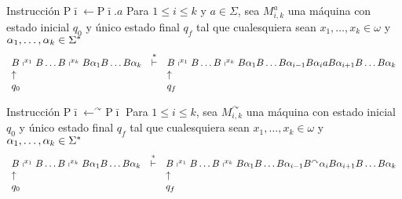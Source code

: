 \begin{frame}
	\begin{block}{Instrucción $\mathrm{P}\bar{\imath} \leftarrow \mathrm{P}\bar{\imath}.a$}
		\PN Para $1 \leq i \leq k$ y $a \in \Sigma $, sea $M_{i,k}^{a}$ una máquina con estado inicial $q_{0}$ y único
		estado final $q_{f}$ tal que cualesquiera sean $x_{1}, \dotsc, x_{k} \in \omega$ y $\alpha_{1}, \dotsc, \alpha_{k}
		\in \Sigma^{\ast}$
		\minLetter
		\[
			\begin{array}{lcl}
				B \shortmid^{x_{1}} B \dotsc B \shortmid^{x_{k}} B \alpha_{1} B \dotsc B \alpha_{k} &\overset{\ast}{\vdash}& B
					\shortmid^{x_{1}} B \dotsc B \shortmid^{x_{k}} B \alpha_{1} B \dotsc B \alpha_{i-1} B \alpha_{i} a B
					\alpha_{i+1} B \dotsc B \alpha_{k} \\
				\uparrow && \uparrow \\
				q_{0} && q_{f}
			\end{array}
		\]
	\end{block}

  \begin{block}{Instrucción $\mathrm{P}\bar{\imath} \leftarrow ^{\curvearrowright}\mathrm{P}\bar{\imath}$}
		\PN Para $1 \leq i \leq k$, sea $M_{i,k}^{\curvearrowright}$ una máquina con estado inicial $q_{0}$ y único estado
		final $q_{f}$ tal que cualesquiera sean $x_{1}, \dotsc, x_{k} \in \omega$ y $\alpha_{1}, \dotsc, \alpha_{k} \in
		\Sigma^{\ast}$
    \minLetter
    \[
      \begin{array}{lcl}
        B \shortmid^{x_{1}} B \dotsc B \shortmid^{x_{k}} B \alpha_{1} B \dotsc B \alpha_{k} &\overset{\ast}{\vdash}& B
          \shortmid^{x_{1}} B \dotsc B \shortmid^{x_{k}} B \alpha_{1} B \dotsc B \alpha_{i-1} B^{\curvearrowright}
          \alpha_{i} B \alpha_{i+1} B \dotsc B \alpha_{k} \\
        \uparrow && \uparrow \\
        q_{0} && q_{f}
      \end{array}
    \]
  \end{block}
\end{frame}
